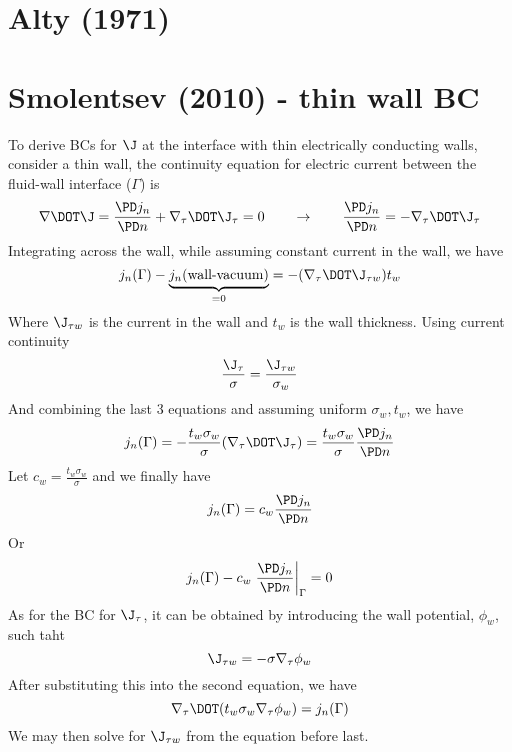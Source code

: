 \documentclass[11pt]{article}
\begin{document}
\section{Alty (1971)}



\newpage

\section{Smolentsev (2010) - thin wall BC}

To derive BCs for $\J$ at the interface with thin electrically conducting walls, consider a thin wall, the continuity equation for electric current between the fluid-wall interface ($\Gamma$) is
\begin{equation}
  \nabla \DOT \J =
  \frac{\PD j_n}{\PD n} +
  \nabla_{\tau} \DOT \J_{\tau} = 0
  \qquad
  \rightarrow
  \qquad
  \frac{\PD j_n}{\PD n} = -
  \nabla_{\tau} \DOT \J_{\tau}
\end{equation}
Integrating across the wall, while assuming constant current in the wall, we have
\begin{equation}
  j_n (\Gamma) - \underbrace{j_n (\text{wall-vacuum})}_{ = 0}
  =
  - (\nabla_{\tau} \DOT \J_{\tau w}) t_w
\end{equation}
Where $\J_{\tau w}$ is the current in the wall and $t_w$ is the wall thickness. Using current continuity
\begin{equation}
  \frac{\J_{\tau}}{\sigma} = \frac{\J_{\tau w}}{\sigma_w}
\end{equation}
And combining the last 3 equations and assuming uniform $\sigma_w,t_w$, we have
\begin{equation}
  j_n (\Gamma) =
  - \frac{t_w \sigma_w}{\sigma}
  (\nabla_{\tau} \DOT \J_{\tau})
  =
  \frac{t_w \sigma_w}{\sigma}
  \frac{\PD j_n}{\PD n}
\end{equation}
Let $c_w = \frac{t_w \sigma_w}{\sigma}$ and we finally have
\begin{equation}
  j_n (\Gamma) =
  c_w
  \frac{\PD j_n}{\PD n}
\end{equation}
Or
\begin{equation}
  j_n (\Gamma) -
  c_w
  \left. \frac{\PD j_n}{\PD n} \right|_{\Gamma} = 0
\end{equation}
As for the BC for $\J_{\tau}$, it can be obtained by introducing the wall potential, $\phi_w$, such taht
\begin{equation}
  \J_{\tau w} = -\sigma \nabla_{\tau} \phi_w
\end{equation}
After substituting this into the second equation, we have
\begin{equation}
  \nabla_{\tau} \DOT (t_w \sigma_w \nabla_{\tau} \phi_w) = j_n(\Gamma)
\end{equation}
We may then solve for $\J_{\tau w}$ from the equation before last.
\end{document}
